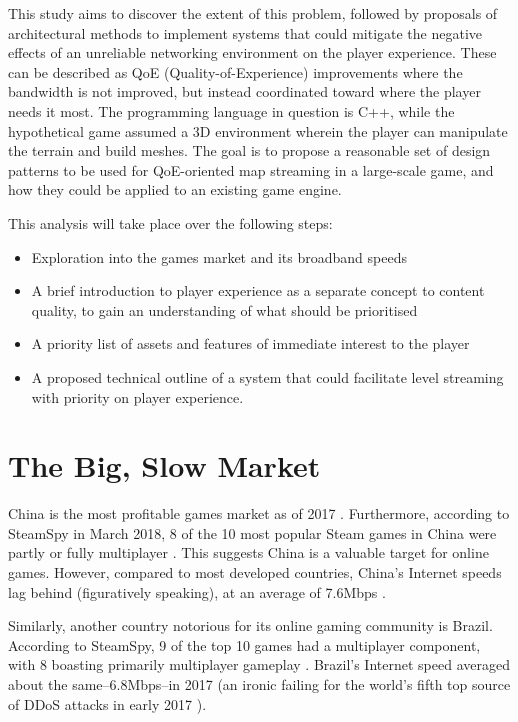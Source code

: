 \documentclass{scrartcl}
\begin{document}
This study aims to discover the extent of this problem, followed by proposals of architectural methods to implement systems that could mitigate the negative effects of an unreliable networking environment on the player experience. These can be described as QoE (Quality-of-Experience) improvements where the bandwidth is not improved, but instead coordinated toward where the player needs it most. The programming language in question is C++, while the hypothetical game assumed a 3D environment wherein the player can manipulate the terrain and build meshes. The goal is to propose a reasonable set of design patterns to be used for QoE-oriented map streaming in a large-scale game, and how they could be applied to an existing game engine.

This analysis will take place over the following steps:

\begin{itemize}
\item Exploration into the games market and its broadband speeds
\item A brief introduction to player experience as a separate concept to content quality, to gain an understanding of what should be prioritised
\item A priority list of assets and features of immediate interest to the player
\item A proposed technical outline of a system that could facilitate level streaming with priority on player experience.
\end{itemize}

\section{The Big, Slow Market}
China is the most profitable games market as of 2017 \cite{chinamarket}. Furthermore, according to SteamSpy in March 2018, 8 of the 10 most popular Steam games in China were partly or fully multiplayer \cite{steamchina}. This suggests China is a valuable target for online games. However, compared to most developed countries, China's Internet speeds lag behind (figuratively speaking), at an average of 7.6Mbps \cite{webspeeds}.

Similarly, another country notorious for its online gaming community is Brazil. According to SteamSpy, 9 of the top 10 games had a multiplayer component, with 8 boasting primarily multiplayer gameplay \cite{steambrazil}. Brazil's Internet speed averaged about the same--6.8Mbps--in 2017 \cite{webspeeds} (an ironic failing for the world's fifth top source of DDoS attacks in early 2017 \cite{websecurity}).
\end{document}
